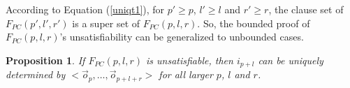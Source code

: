 \documentclass[twocolumn]{article}
\newtheorem{proposition}{Proposition}
\begin{document}


According to Equation (\ref{uniqt1}),
for $p'\ge p$, $l'\ge l$ and $r'\ge r$,
the clause set of $F_{PC}(p',l',r')$ is a super set of $F_{PC}(p,l,r)$.
So,
the bounded proof of $F_{PC}(p,l,r)$'s unsatisfiability
can be generalized to unbounded cases.


\begin{proposition}\label{prop_pc1}
If $F_{PC}(p,l,r)$ is unsatisfiable,
then $i_{p+l}$ can be uniquely determined by $<\vec{o}_{p},\dots,\vec{o}_{p+l+r}>$ for all larger $p$, $l$ and $r$.
\end{proposition}

% 
% 
\end{document}
